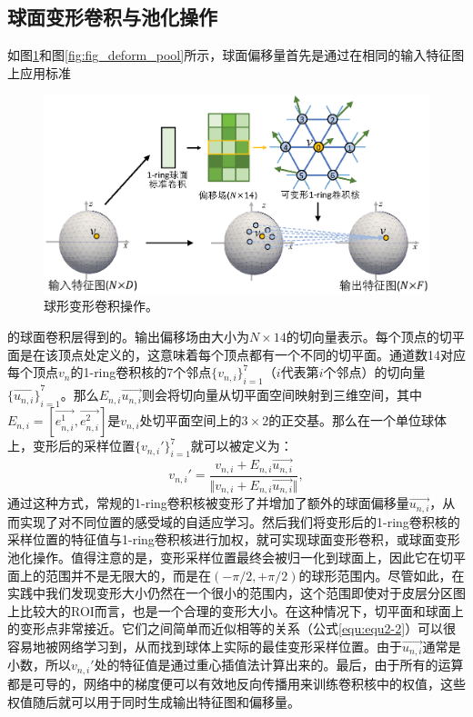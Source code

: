 \subsection{球面变形卷积与池化操作}
如图\ref{fig:fig_deform_conv}和图\ref{fig:fig_deform_pool}所示，球面偏移量首先是通过在相同的输入特征图上应用标准
\begin{figure}[h]
	\centering
	\includegraphics[width=0.85\linewidth]{figure/spheircal_deform_conv.eps}
	\caption{球形变形卷积操作。}
	\label{fig:fig_deform_conv}
\end{figure}
的球面卷积层得到的。输出偏移场由大小为$N\times 14$的切向量表示。每个顶点的切平面是在该顶点处定义的，这意味着每个顶点都有一个不同的切平面。通道数14对应每个顶点$v_n$的1-ring卷积核的7个邻点${\{v_{n,i}\}}_{i=1}^7$（$i$代表第$i$个邻点）的切向量${\{\overrightarrow{u_{n,i}}\}}_{i=1}^7$。那么$E_{n,i}\overrightarrow{u_{n,i}}$则会将切向量从切平面空间映射到三维空间，其中$E_{n,i}=[\overrightarrow{e_{n,i}^1},\overrightarrow{e_{n,i}^2}]$是$v_{n,i}$处切平面空间上的$3\times 2$的正交基。那么在一个单位球体上，变形后的采样位置$\{v_{n,i}'\}_{i=1}^7$就可以被定义为：
\begin{equation}\label{equ:equ2-2}
v_{n,i}'=\frac{v_{n,i}+E_{n,i}\overrightarrow{u_{n,i}}}{\Vert v_{n,i}+E_{n,i}\overrightarrow{u_{n,i}}\Vert},
\end{equation}
通过这种方式，常规的1-ring卷积核被变形了并增加了额外的球面偏移量$\overrightarrow{u_{n,i}}$，从而实现了对不同位置的感受域的自适应学习。然后我们将变形后的1-ring卷积核的采样位置的特征值与1-ring卷积核进行加权，就可实现球面变形卷积，或球面变形池化操作。值得注意的是，变形采样位置最终会被归一化到球面上，因此它在切平面上的范围并不是无限大的，而是在$(-\pi/2,+\pi/2)$的球形范围内。尽管如此，在实践中我们发现变形大小仍然在一个很小的范围内，这个范围即使对于皮层分区图上比较大的ROI而言，也是一个合理的变形大小。在这种情况下，切平面和球面上的变形点非常接近。它们之间简单而近似相等的关系（公式\ref{equ:equ2-2}）可以很容易地被网络学习到，从而找到球体上实际的最佳变形采样位置。由于$\overrightarrow{u_{n,i}}$通常是小数，所以$v_{n,i}'$处的特征值是通过重心插值法\cite{yeo2009spherical}计算出来的。最后，由于所有的运算都是可导的，网络中的梯度便可以有效地反向传播用来训练卷积核中的权值，这些权值随后就可以用于同时生成输出特征图和偏移量。

